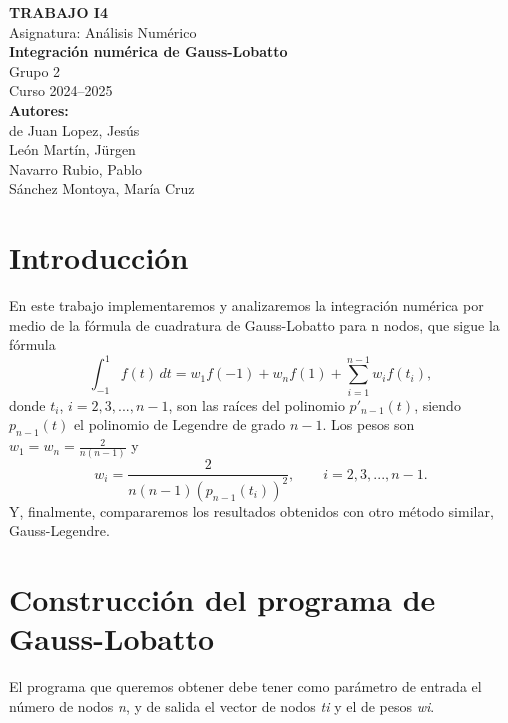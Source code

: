 \documentclass[a4paper]{article}
\begin{document}
\begin{titlepage}
    \begin{center}
        \vspace*{2cm}
        
        \Large
        \textbf{TRABAJO I4} \\[0.5cm]
        \large
        Asignatura: Análisis Numérico \\[2cm]
        
        {\fontsize{40}{48}\selectfont
        \textbf{Integración numérica de Gauss-Lobatto}} \\[3cm]
        
        \Large
        Grupo 2 \\[0.5cm]
        Curso 2024--2025 \\[3cm]
        
        \textbf{Autores:} \\[0.5cm]
        de Juan Lopez, Jesús \\
        León Martín, Jürgen \\
        Navarro Rubio, Pablo \\
        Sánchez Montoya, María Cruz \\[4cm]
        
    \end{center}
\end{titlepage}

\tableofcontents

\newpage


\section{Introducción}
En este trabajo implementaremos y analizaremos la integración numérica por medio de la fórmula de cuadratura de Gauss-Lobatto para n nodos, que sigue la fórmula
\[
\int_{-1}^{1} \! f(t)  \,dt = w_1 f(-1) + w_n f(1) + \sum_{i=1}^{n-1}w_i f(t_i),
\]
donde $t_i$, $i=2, 3,...,n-1$, son las raíces del polinomio $p'_{n-1}(t)$, siendo $p_{n-1}(t)$ el polinomio de Legendre de grado $n-1$. Los pesos son $w_1 = w_n = \tfrac{2}{n(n-1)}$ y
\[
w_i=\frac{2}{n(n-1)(p_{n-1}(t_i))^2},\qquad i=2,3,...,n-1.
\]
Y, finalmente, compararemos los resultados obtenidos con otro método similar, Gauss-Legendre.


\section{Construcción del programa de Gauss-Lobatto}
El programa que queremos obtener debe tener como parámetro de entrada el número de nodos \textit{n}, y de salida el vector de nodos \textit{ti} y el de pesos \textit{wi}.
\end{document}
